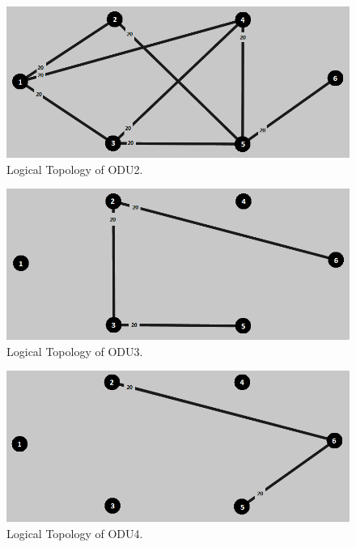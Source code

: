 \begin{figure}[H]
\centering
\includegraphics[width=13cm]{sdf/heuristic/figures/topologies/opaque_protec/high/logical_topology_odu2_high}
\caption{Logical Topology of ODU2.}
\label{logical_ODU2_surv_ref_high_heuristic}
\end{figure}

\begin{figure}[H]
\centering
\includegraphics[width=13cm]{sdf/heuristic/figures/topologies/opaque_protec/high/logical_topology_odu3_high}
\caption{Logical Topology of ODU3.}
\label{logical_ODU3_surv_ref_high_heuristic}
\end{figure}

\begin{figure}[H]
\centering
\includegraphics[width=13cm]{sdf/heuristic/figures/topologies/opaque_protec/high/logical_topology_odu4_high}
\caption{Logical Topology of ODU4.}
\label{logical_ODU4_surv_ref_high_heuristic}
\end{figure}

